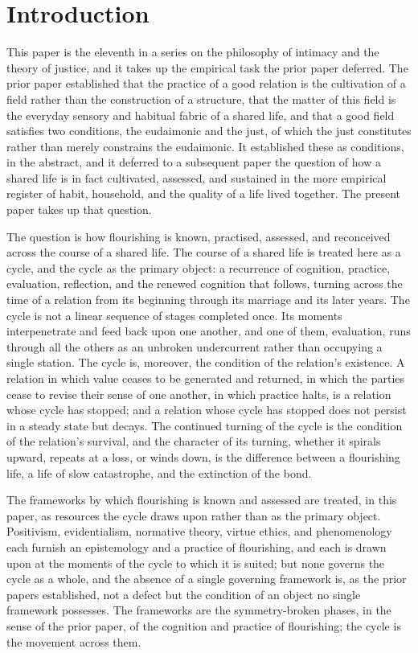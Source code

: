 \section{Introduction}
\label{p11:sec:intro}

\noindent
This paper is the eleventh in a series on the philosophy of intimacy and the theory of justice, and it takes up the empirical task the prior paper deferred. The prior paper established that the practice of a good relation is the cultivation of a field rather than the construction of a structure, that the matter of this field is the everyday sensory and habitual fabric of a shared life, and that a good field satisfies two conditions, the eudaimonic and the just, of which the just constitutes rather than merely constrains the eudaimonic. It established these as conditions, in the abstract, and it deferred to a subsequent paper the question of how a shared life is in fact cultivated, assessed, and sustained in the more empirical register of habit, household, and the quality of a life lived together. The present paper takes up that question.

The question is how flourishing is known, practised, assessed, and reconceived across the course of a shared life. The course of a shared life is treated here as a cycle, and the cycle as the primary object: a recurrence of cognition, practice, evaluation, reflection, and the renewed cognition that follows, turning across the time of a relation from its beginning through its marriage and its later years. The cycle is not a linear sequence of stages completed once. Its moments interpenetrate and feed back upon one another, and one of them, evaluation, runs through all the others as an unbroken undercurrent rather than occupying a single station. The cycle is, moreover, the condition of the relation's existence. A relation in which value ceases to be generated and returned, in which the parties cease to revise their sense of one another, in which practice halts, is a relation whose cycle has stopped; and a relation whose cycle has stopped does not persist in a steady state but decays. The continued turning of the cycle is the condition of the relation's survival, and the character of its turning, whether it spirals upward, repeats at a loss, or winds down, is the difference between a flourishing life, a life of slow catastrophe, and the extinction of the bond.

The frameworks by which flourishing is known and assessed are treated, in this paper, as resources the cycle draws upon rather than as the primary object. Positivism, evidentialism, normative theory, virtue ethics, and phenomenology each furnish an epistemology and a practice of flourishing, and each is drawn upon at the moments of the cycle to which it is suited; but none governs the cycle as a whole, and the absence of a single governing framework is, as the prior papers established, not a defect but the condition of an object no single framework possesses. The frameworks are the symmetry-broken phases, in the sense of the prior paper, of the cognition and practice of flourishing; the cycle is the movement across them.

